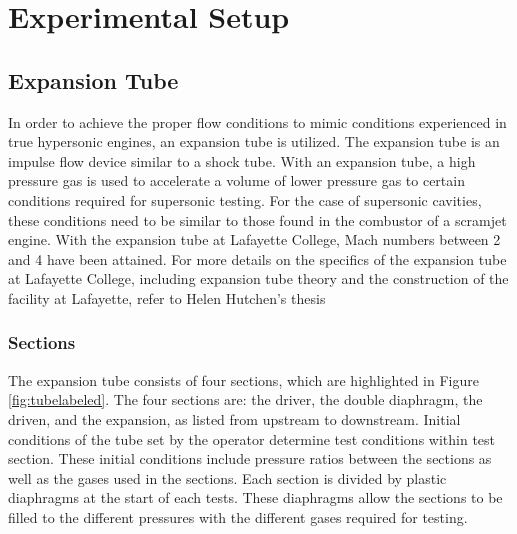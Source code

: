 
\chapter{Experimental Setup} %

\label{Chapter3} %



\section{Expansion Tube}

In order to achieve the proper flow conditions to mimic conditions experienced in true hypersonic engines, an expansion tube is utilized. The expansion tube is an impulse flow device similar to a shock tube. With an expansion tube, a high pressure gas is used to accelerate a volume of lower pressure gas to certain conditions required for supersonic testing. For the case of supersonic cavities, these conditions need to be similar to those found in the combustor of a scramjet engine. With the expansion tube at Lafayette College, Mach numbers between 2 and 4 have been attained. For more details on the specifics of the expansion tube at Lafayette College, including expansion tube theory and the construction of the facility at Lafayette, refer to Helen Hutchen's thesis \cite{Hutchens2015}

\subsection{Sections}

The expansion tube consists of four sections, which are highlighted in Figure \ref{fig:tubelabeled}. The four sections are: the driver, the double diaphragm, the driven, and the expansion, as listed from upstream to downstream. Initial conditions of the tube set by the operator determine test conditions within test section. These initial conditions include pressure ratios between the sections as well as the gases used in the sections. Each section is divided by plastic diaphragms at the start of each tests. These diaphragms allow the sections to be filled to the different pressures with the different gases required for testing.

